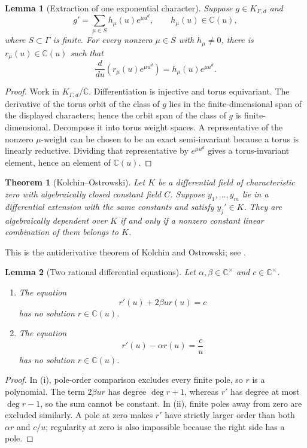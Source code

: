\documentclass[11pt]{article}
\numberwithin{equation}{section}
\newtheorem{theorem}{Theorem}[section]
\newtheorem{lemma}[lemma]{Lemma}
\theoremstyle{definition}
\theoremstyle{remark}
\newcommand{\C}{\mathbb C}
\begin{document}
\begin{lemma}[Extraction of one exponential character]
\label{lem:character-extraction}
Suppose $g\in K_{\Gamma,d}$ and
\[
  g'=\sum_{\mu\in S}h_\mu(u)e^{\mu u^d},
  \qquad h_\mu(u)\in\C(u),
\]
where $S\subset\Gamma$ is finite.  For every nonzero $\mu\in S$ with
$h_\mu\ne0$, there is $r_\mu(u)\in\C(u)$ such that
\[
  \frac{d}{du}\left(r_\mu(u)e^{\mu u^d}\right)
  =h_\mu(u)e^{\mu u^d}.
\]
\end{lemma}

\begin{proof}
Work in $K_{\Gamma,d}/\C$.  Differentiation is injective and torus
equivariant.  The derivative of the torus orbit of the class of $g$ lies in
the finite-dimensional span of the displayed characters; hence the orbit
span of the class of $g$ is finite-dimensional.  Decompose it into torus
weight spaces.  A representative of the nonzero $\mu$-weight can be chosen
to be an exact semi-invariant because a torus is linearly reductive.  Dividing
that representative by $e^{\mu u^d}$ gives a torus-invariant element, hence an
element of $\C(u)$.
\end{proof}

\begin{theorem}[Kolchin--Ostrowski]\label{thm:KO}
Let $K$ be a differential field of characteristic zero with algebraically
closed constant field $C$.  Suppose $y_1,\ldots,y_m$ lie in a differential
extension with the same constants and satisfy $y_j'\in K$.  They are
algebraically dependent over $K$ if and only if a nonzero constant linear
combination of them belongs to $K$.
\end{theorem}

This is the antiderivative theorem of Kolchin and Ostrowski; see
\cite{Kolchin,vanDerPutSinger}.

\begin{lemma}[Two rational differential equations]
\label{lem:rational-odes}
Let $\alpha,\beta\in\C^\times$ and $c\in\C^\times$.
\begin{enumerate}[label=\textup{(\roman*)},leftmargin=2.4em]
\item The equation
\[
  r'(u)+2\beta u r(u)=c
\]
has no solution $r\in\C(u)$.
\item The equation
\[
  r'(u)-\alpha r(u)=\frac{c}{u}
\]
has no solution $r\in\C(u)$.
\end{enumerate}
\end{lemma}

\begin{proof}
In (i), pole-order comparison excludes every finite pole, so $r$ is a
polynomial.  The term $2\beta ur$ has degree $\deg r+1$, whereas $r'$ has
degree at most $\deg r-1$, so the sum cannot be constant.  In (ii), finite poles away from zero are
excluded similarly.  A pole at zero makes $r'$ have strictly larger order
than both $\alpha r$ and $c/u$; regularity at zero is also impossible because
the right side has a pole.
\end{proof}
\end{document}
